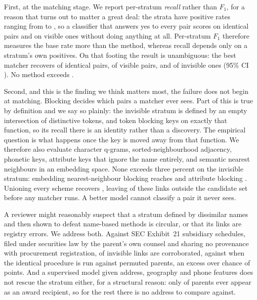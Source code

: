 First, at the matching stage. We report per-stratum \emph{recall} rather than $F_1$, for
a reason that turns out to matter a great deal: the strata have positive rates ranging
from \BaseVisibleRate to \BaseIdenticalRate, so a classifier that answers yes to every
pair scores \BaseIdenticalF on identical pairs and \BaseVisibleF on visible ones without
doing anything at all. Per-stratum $F_1$ therefore measures the base rate more than the
method, whereas recall depends only on a stratum's own positives. On that footing the
result is unambiguous: the best matcher recovers \BestRecallIdentical of identical
pairs, \BestRecallVisible of visible pairs, and \BestRecallInvisible of invisible ones
(95\% CI \BestRecallInvisibleCI). No method exceeds \AnyInvisibleRecallMax.

Second, and this is the finding we think matters most, the failure does not begin
at matching. Blocking decides which pairs a matcher ever sees. Part of this is true by
definition and we say so plainly: the invisible stratum is defined by an empty
intersection of distinctive tokens, and token blocking keys on exactly that function, so
its \BlkTokenInvisible recall there is an identity rather than a discovery. The
empirical question is what happens once the key is moved away from that function. We
therefore also evaluate character q-grams, sorted-neighbourhood adjacency, phonetic
keys, attribute keys that ignore the name entirely, and semantic nearest neighbours in
an embedding space. None exceeds three percent on the invisible stratum: embedding
nearest-neighbour blocking reaches \BlkAnnInvisible and attribute blocking
\BlkAttrInvisible. Unioning every scheme recovers \BlkUnionInvisible, leaving
\BlkInvisibleLost of these links outside the candidate set before any matcher runs. A
better model cannot classify a pair it never sees.

A reviewer might reasonably suspect that a stratum defined by dissimilar names and then
shown to defeat name-based methods is circular, or that its links are registry errors.
We address both. Against SEC Exhibit~21 subsidiary schedules, filed under securities
law by the parent's own counsel and sharing no provenance with procurement registration,
\EdgarInvisibleConfirmPct of invisible links are corroborated, against
\EdgarRandomParentPct when the identical procedure is run against permuted parents, an
excess over chance of \EdgarExcessOverChance points. And a supervised model given
address, geography and phone features does not rescue the stratum either, for a
structural reason: only \ParentsTransactingPct of parents ever appear as an award
recipient, so for the rest there is no address to compare against.

